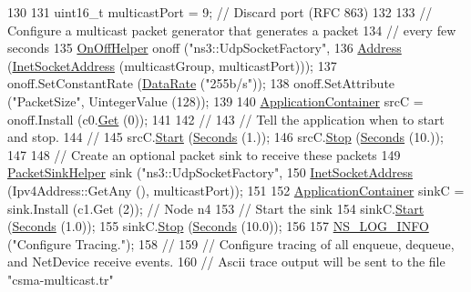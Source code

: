 \begin{DoxyCode}
130 
131   uint16\_t multicastPort = 9;   \textcolor{comment}{// Discard port (RFC 863)}
132 
133   \textcolor{comment}{// Configure a multicast packet generator that generates a packet}
134   \textcolor{comment}{// every few seconds}
135   \hyperlink{classns3_1_1OnOffHelper}{OnOffHelper} onoff (\textcolor{stringliteral}{"ns3::UdpSocketFactory"}, 
136                      \hyperlink{classns3_1_1Address}{Address} (\hyperlink{classns3_1_1InetSocketAddress}{InetSocketAddress} (multicastGroup, multicastPort)));
137   onoff.SetConstantRate (\hyperlink{classns3_1_1DataRate}{DataRate} (\textcolor{stringliteral}{"255b/s"}));
138   onoff.SetAttribute (\textcolor{stringliteral}{"PacketSize"}, UintegerValue (128));
139 
140   \hyperlink{classns3_1_1ApplicationContainer}{ApplicationContainer} srcC = onoff.Install (c0.\hyperlink{classns3_1_1NodeContainer_a9ed96e2ecc22e0f5a3d4842eb9bf90bf}{Get} (0));
141 
142   \textcolor{comment}{//}
143   \textcolor{comment}{// Tell the application when to start and stop.}
144   \textcolor{comment}{//}
145   srcC.\hyperlink{classns3_1_1ApplicationContainer_a8eff87926507020bbe3e1390358a54a7}{Start} (\hyperlink{group__timecivil_ga33c34b816f8ff6628e33d5c8e9713b9e}{Seconds} (1.));
146   srcC.\hyperlink{classns3_1_1ApplicationContainer_adfc52f9aa4020c8714679b00bbb9ddb3}{Stop} (\hyperlink{group__timecivil_ga33c34b816f8ff6628e33d5c8e9713b9e}{Seconds} (10.));
147 
148   \textcolor{comment}{// Create an optional packet sink to receive these packets}
149   \hyperlink{classns3_1_1PacketSinkHelper}{PacketSinkHelper} sink (\textcolor{stringliteral}{"ns3::UdpSocketFactory"},
150                          \hyperlink{classns3_1_1InetSocketAddress}{InetSocketAddress} (Ipv4Address::GetAny (), multicastPort));
151 
152   \hyperlink{classns3_1_1ApplicationContainer}{ApplicationContainer} sinkC = sink.Install (c1.Get (2)); \textcolor{comment}{// Node n4 }
153   \textcolor{comment}{// Start the sink}
154   sinkC.\hyperlink{classns3_1_1ApplicationContainer_a8eff87926507020bbe3e1390358a54a7}{Start} (\hyperlink{group__timecivil_ga33c34b816f8ff6628e33d5c8e9713b9e}{Seconds} (1.0));
155   sinkC.\hyperlink{classns3_1_1ApplicationContainer_adfc52f9aa4020c8714679b00bbb9ddb3}{Stop} (\hyperlink{group__timecivil_ga33c34b816f8ff6628e33d5c8e9713b9e}{Seconds} (10.0));
156 
157   \hyperlink{group__logging_gafbd73ee2cf9f26b319f49086d8e860fb}{NS\_LOG\_INFO} (\textcolor{stringliteral}{"Configure Tracing."});
158   \textcolor{comment}{//}
159   \textcolor{comment}{// Configure tracing of all enqueue, dequeue, and NetDevice receive events.}
160   \textcolor{comment}{// Ascii trace output will be sent to the file "csma-multicast.tr"}

\end{DoxyCode}
